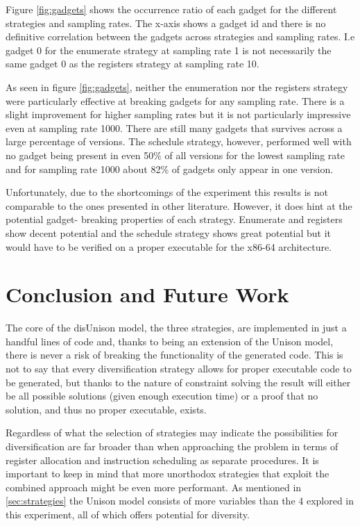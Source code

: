 Figure \ref{fig:gadgets} shows the occurrence ratio of each gadget for the different
strategies and sampling rates. The x-axis shows a gadget id and there is no definitive
correlation between the gadgets across strategies and sampling rates. I.e gadget 0 for the
enumerate strategy at sampling rate 1 is not necessarily the same gadget 0 as the registers
strategy at sampling rate 10.

As seen in figure \ref{fig:gadgets}, neither the enumeration nor the registers strategy
were particularly effective at breaking gadgets for any sampling rate. There is a slight
improvement for higher sampling rates but it is not particularly impressive even at
sampling rate 1000. There are still many gadgets that survives across a large percentage of
versions. The schedule strategy, however, performed well with no gadget being present
in even 50\% of all versions for the lowest sampling rate and for sampling rate 1000
about 82\% of gadgets only appear in one version.

Unfortunately, due to the shortcomings of the experiment this results is not comparable to
the ones presented in other literature. However, it does hint at the potential gadget-
breaking properties of each strategy. Enumerate and registers show decent potential and the
schedule strategy shows great potential but it would have to be verified on a proper
executable for the x86-64 architecture.

\section{Conclusion and Future Work}

The core of the disUnison model, the three strategies, are implemented in just a handful
lines of code and, thanks to being an extension of the Unison model, there is never a risk
of breaking the functionality of the generated code. This is not to say that every
diversification strategy allows for proper executable code to be generated, but thanks to
the nature of constraint solving the result will either be all possible solutions
(given enough execution time) or a proof that no solution, and thus no proper executable,
exists.

Regardless of what the selection of strategies may indicate the possibilities for
diversification are far broader than when approaching the problem in terms of register
allocation and instruction scheduling as separate procedures. It is important to keep in
mind that more unorthodox strategies that exploit the combined approach might be even
more performant. As mentioned in \ref{sec:strategies} the Unison model consists of more
variables than the 4 explored in this experiment, all of which offers potential for
diversity.

